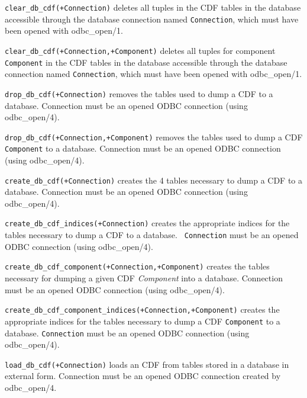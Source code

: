 \begin{description}

 {\tt clear\_db\_cdf(+Connection)} deletes all
tuples in the CDF tables in the database accessible through the
database connection named {\tt Connection}, which must have been opened
with odbc\_open/1.



{\tt clear\_db\_cdf(+Connection,+Component)} deletes all tuples for
component {\tt Component} in the CDF tables in the database accessible
through the database connection named {\tt Connection}, which must have
been opened with odbc\_open/1.  



 {\tt drop\_db\_cdf(+Connection)} removes the
tables used to dump a CDF to a database. Connection must be an opened
ODBC connection (using odbc\_open/4).


{\tt drop\_db\_cdf(+Connection,+Component)} removes the tables used to
dump a CDF {\tt Component} to a database. Connection must be an opened
ODBC connection (using odbc\_open/4).

 {\tt create\_db\_cdf(+Connection)} creates
the 4 tables necessary to dump a CDF to a database.  Connection must
be an opened ODBC connection (using odbc\_open/4).


{\tt create\_db\_cdf\_indices(+Connection)} creates the appropriate
indices for the tables necessary to dump a CDF to a database. {\tt
Connection} must be an opened ODBC connection (using odbc\_open/4).

{\tt create\_db\_cdf\_component(+Connection,+Component)} creates the tables
necessary for dumping a given CDF {\em Component} into a
database. Connection must be an opened ODBC connection (using
odbc\_open/4).


{\tt create\_db\_cdf\_component\_indices(+Connection,+Component)} creates
the appropriate indices for the tables necessary to dump a CDF
{\tt Component} to a database. {\tt Connection} must be an opened ODBC
connection (using odbc\_open/4).


 {\tt load\_db\_cdf(+Connection)} loads an CDF
from tables stored in a database in external form.  Connection must be
an opened ODBC connection created by odbc\_open/4.


\end{description}
